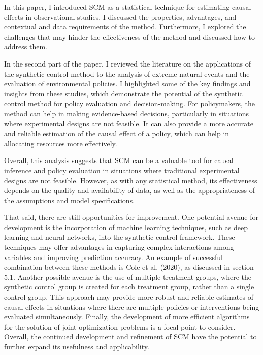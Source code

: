 \documentclass[12pt,a4paper,draft]{article}
\begin{document}
In this paper, I introduced SCM as a statistical technique 
for estimating causal effects in observational studies. 
I discussed the properties, advantages, and contextual and data requirements 
of the method. 
Furthermore, I explored the challenges that may hinder the effectiveness of the 
method and discussed how to address them.

In the second part of the paper, I reviewed the literature on the applications of 
the synthetic control method to the analysis of extreme natural events and the 
evaluation of environmental policies. 
I highlighted some of the key findings and insights from these studies, which 
demonstrate the potential of the synthetic control method for policy evaluation 
and decision-making.
For policymakers, the method can help in making evidence-based decisions, 
particularly in situations where experimental designs are not feasible. 
It can also provide a more accurate and reliable estimation of the causal effect 
of a policy, which can help in allocating resources more effectively.

Overall, this analysis suggests that SCM can be a valuable 
tool for causal inference and policy evaluation in situations where traditional 
experimental designs are not feasible. 
However, as with any statistical method, its effectiveness depends on the quality 
and availability of data, as well as the appropriateness of the assumptions and 
model specifications. 

That said, there are still opportunities for improvement. 
One potential avenue for development is the incorporation of machine learning 
techniques, such as deep learning and neural networks, into the synthetic 
control framework. These techniques may offer advantages in capturing complex 
interactions among variables and improving prediction accuracy. 
An example of successful combination between these methods is Cole et al. (2020), 
as discussed in section 5.1.
Another possible avenue is the use of multiple treatment groups, where the 
synthetic control group is created for each treatment group, rather than a 
single control group. This approach may provide more robust and reliable 
estimates of causal effects in situations where there are multiple policies 
or interventions being evaluated simultaneously. 
Finally, the development of more efficient algorithms for the solution of 
joint optimization problems is a focal point to consider.
Overall, the continued development and refinement of SCM have the potential to 
further expand its usefulness and applicability.
\end{document}

